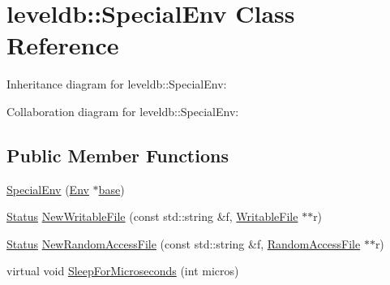 \hypertarget{classleveldb_1_1_special_env}{\section{leveldb\-:\-:Special\-Env Class Reference}
\label{classleveldb_1_1_special_env}
}


Inheritance diagram for leveldb\-:\-:Special\-Env\-:


Collaboration diagram for leveldb\-:\-:Special\-Env\-:
\subsection*{Public Member Functions}
\begin{DoxyCompactItemize}
\item 
\hyperlink{classleveldb_1_1_special_env_a29fed9502e35a1f9374e0f46f4bd1181}{Special\-Env} (\hyperlink{classleveldb_1_1_env}{Env} $\ast$\hyperlink{testharness_8cc_a70ff0f6c026c3dd1ef6aaf504e7fddc3}{base})
\item 
\hyperlink{classleveldb_1_1_status}{Status} \hyperlink{classleveldb_1_1_special_env_a2a8b88051ccc5f957321d47af0dae5ed}{New\-Writable\-File} (const std\-::string \&f, \hyperlink{classleveldb_1_1_writable_file}{Writable\-File} $\ast$$\ast$r)
\item 
\hyperlink{classleveldb_1_1_status}{Status} \hyperlink{classleveldb_1_1_special_env_ae04ba2b7b94753d805e316dbda74ec00}{New\-Random\-Access\-File} (const std\-::string \&f, \hyperlink{classleveldb_1_1_random_access_file}{Random\-Access\-File} $\ast$$\ast$r)
\item 
virtual void \hyperlink{classleveldb_1_1_special_env_afcceb315ff4d8a96805b71a41502da94}{Sleep\-For\-Microseconds} (int micros)
\end{DoxyCompactItemize}
